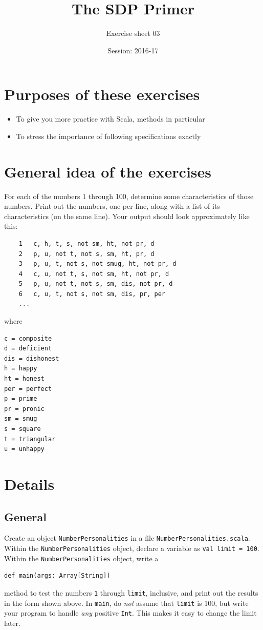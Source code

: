 \documentclass[12pt,a4paper,times]{article}
\title{The SDP Primer}
\author{Exercise sheet 03}
\date{Session: 2016-17}
\begin{document}
\maketitle
\thispagestyle{fancy}

\section{Purposes of these exercises}\label{purposes-of-this-assignment}
\begin{itemize}
\item
To give you more practice with Scala, methods in particular
\item
To stress the importance of following specifications exactly
\end{itemize}

\section{General idea of the exercises}\label{general-idea-of-the-assignment}

For each of the numbers 1 through 100, determine some characteristics of
those numbers. Print out the numbers, one per line, along with a list of
its characteristics (on the same line).
Your output should look approximately like this:
\begin{Verbatim}
    1   c, h, t, s, not sm, ht, not pr, d
    2   p, u, not t, not s, sm, ht, pr, d
    3   p, u, t, not s, not smug, ht, not pr, d
    4   c, u, not t, s, not sm, ht, not pr, d
    5   p, u, not t, not s, sm, dis, not pr, d
    6   c, u, t, not s, not sm, dis, pr, per
    ...
\end{Verbatim}
where
\begin{Verbatim}
c = composite
d = deficient
dis = dishonest
h = happy
ht = honest
per = perfect
p = prime
pr = pronic
sm = smug
s = square
t = triangular
u = unhappy
\end{Verbatim}

\section{Details}\label{details}

\subsection{General}\label{general}

Create an object \verb!NumberPersonalities! in a file
\verb!NumberPersonalities.scala!.
Within the \verb!NumberPersonalities! object, declare a variable as \verb!val limit = 100!.
Within the \verb!NumberPersonalities! object, write a
\begin{Verbatim}
def main(args: Array[String]) 
\end{Verbatim}
method to test the
numbers \verb!1! through \verb!limit!, inclusive, and print out
the results in the form shown above. In \verb!main!, do \emph{not}
assume that \verb!limit! is 100, but write your program to handle
\emph{any} positive \verb!Int!. This makes it easy to change the limit later.
\end{document}
